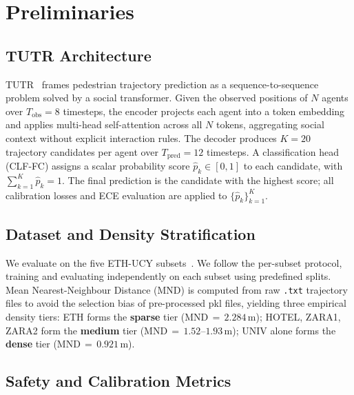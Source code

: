 \documentclass{article}
\begin{document}

\section{Preliminaries}
\label{sec:prelim}

\subsection{TUTR Architecture}
\label{sec:prelim:tutr}

TUTR~\cite{shi2023tutr} frames pedestrian trajectory prediction as a
sequence-to-sequence problem solved by a social transformer. Given the
observed positions of \(N\) agents over \(T_\text{obs} = 8\) timesteps, the
encoder projects each agent into a token embedding and applies multi-head
self-attention across all \(N\) tokens, aggregating social context without
explicit interaction rules. The decoder produces \(K=20\) trajectory candidates
per agent over \(T_\text{pred} = 12\) timesteps. A classification head
(CLF-FC) assigns a scalar probability score \(\hat{p}_k \in [0,1]\) to each
candidate, with \(\sum_{k=1}^{K} \hat{p}_k = 1\). The final prediction is the
candidate with the highest score; all calibration losses and ECE evaluation
are applied to \(\{\hat{p}_k\}_{k=1}^{K}\).

\subsection{Dataset and Density Stratification}
\label{sec:prelim:dataset}

We evaluate on the five ETH-UCY subsets~\cite{pellegrini2009eth,lerner2007ucy}.
We follow the per-subset protocol, training and evaluating independently on
each subset using predefined splits. Mean Nearest-Neighbour Distance (MND) is
computed from raw \texttt{.txt} trajectory files to avoid the selection bias
of pre-processed pkl files, yielding three empirical density tiers: ETH forms
the \textbf{sparse} tier (MND\,\(=\,2.284\)\,m); HOTEL, ZARA1, ZARA2 form the
\textbf{medium} tier (MND\,\(=\,1.52\)--\(1.93\)\,m); UNIV alone forms the
\textbf{dense} tier (MND\,\(=\,0.921\)\,m).

\subsection{Safety and Calibration Metrics}
\label{sec:prelim:metrics}
\end{document}
